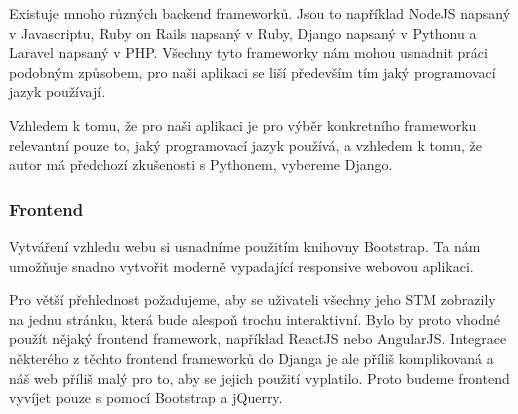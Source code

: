 Existuje mnoho různých backend frameworků.
Jsou to například NodeJS napsaný v Javascriptu, Ruby on Rails napsaný v Ruby, Django napsaný v Pythonu a
Laravel napsaný v PHP. %
Všechny tyto frameworky nám mohou usnadnit práci podobným způsobem, pro naši aplikaci se liší především
tím jaký programovací jazyk používají.

Vzhledem k tomu, že pro naši aplikaci je pro výběr konkretního frameworku relevantní pouze to, jaký programovací
jazyk používá, a vzhledem k tomu, že autor má předchozí zkušenosti s Pythonem, vybereme Django.

\subsubsection{Frontend}
Vytváření vzhledu webu si usnadníme použitím knihovny Bootstrap.
Ta nám umožňuje snadno vytvořit moderně vypadající responsive webovou aplikaci. %

Pro větší přehlednost požadujeme, aby se uživateli všechny jeho STM zobrazily na jednu stránku,
která bude alespoň trochu interaktivní.
Bylo by proto vhodné použít nějaký frontend framework, například ReactJS nebo AngularJS.
Integrace některého z těchto frontend frameworků do Djanga je ale příliš komplikovaná a náš web
příliš malý pro to, aby se jejich použití vyplatilo.
Proto budeme frontend vyvíjet pouze s pomocí Bootstrap a jQuerry.
